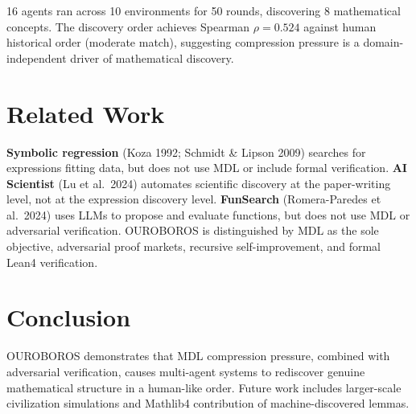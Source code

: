 \documentclass{article}
\begin{document}
16 agents ran across 10 environments for
50 rounds, discovering
8 mathematical concepts.
The discovery order achieves Spearman $\rho = 0.524$
against human historical order (moderate match),
suggesting compression pressure is a domain-independent driver of
mathematical discovery.

\section{Related Work}

\textbf{Symbolic regression} (Koza 1992; Schmidt \& Lipson 2009) searches
for expressions fitting data, but does not use MDL or include formal verification.
\textbf{AI Scientist} (Lu et al.\ 2024) automates scientific discovery at the
paper-writing level, not at the expression discovery level.
\textbf{FunSearch} (Romera-Paredes et al.\ 2024) uses LLMs to propose and
evaluate functions, but does not use MDL or adversarial verification.
OUROBOROS is distinguished by MDL as the sole objective, adversarial proof
markets, recursive self-improvement, and formal Lean4 verification.

\section{Conclusion}

OUROBOROS demonstrates that MDL compression pressure, combined with
adversarial verification, causes multi-agent systems to rediscover genuine
mathematical structure in a human-like order.
Future work includes larger-scale civilization simulations and Mathlib4
contribution of machine-discovered lemmas.
\end{document}
